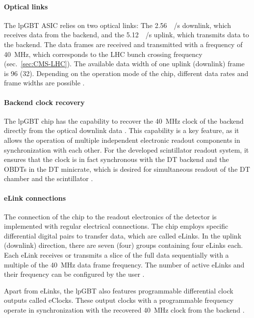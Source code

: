 \paragraph{Optical links}
The \ac{lpGBT} \ac{ASIC} relies on two optical links: The \SI{2.56}{\giga\bit/\second} downlink, which receives data from the backend, and the \SI{5.12}{\giga\bit/\second} uplink, which transmits data to the backend. The data frames are received and transmitted with a frequency of \SI{40}{\mega\hertz}, which corresponds to the \ac{LHC} bunch crossing frequency (sec.\ \ref{sec:CMS-LHC}). The available data width of one uplink (downlink) frame is \SI{96}{\bit} (\SI{32}{\bit}). Depending on the operation mode of the chip, different data rates and frame widths are possible \cite{lpGBT-Main}.
\paragraph{Backend clock recovery}
The \ac{lpGBT} chip has the capability to recover the \SI{40}{\mega\hertz} clock of the backend directly from the optical downlink data \cite{lpGBT-Main}. This capability is a key feature, as it allows the operation of multiple independent electronic readout components in synchronization with each other. For the developed scintillator readout system, it ensures that the clock is in fact synchronous with the \ac{DT} backend and the \acp{OBDT} in the \ac{DT} minicrate, which is desired for simultaneous readout of the \ac{DT} chamber and the scintillator \cite{lpGBT-Main}.
\paragraph{eLink connections}
The connection of the chip to the readout electronics of the detector is implemented with regular electrical connections. The chip employs specific differential digital pairs to transfer data, which are called eLinks. In the uplink (downlink) direction, there are seven (four) groups containing four eLinks each. Each eLink receives or transmits a slice of the full data sequentially with a multiple of the \SI{40}{\mega\hertz} data frame frequency. The number of active eLinks and their frequency can be configured by the user \cite{lpGBT-Main}.
\par Apart from eLinks, the \ac{lpGBT} also features programmable differential clock outputs called eClocks. These output clocks with a programmable frequency operate in synchronization with the recovered \SI{40}{\mega\hertz} clock from the backend \cite{lpGBT-Main}.


